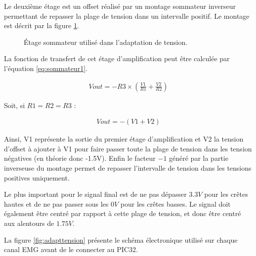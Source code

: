 \documentclass[letterpaper, twoside, 12pt, memoire, creativecommons, hyperref]{thETS}
\begin{document}
Le deuxième étage est un offset réalisé par un montage sommateur inverseur permettant de repasser la plage de tension dans un intervalle positif. Le montage est décrit par la figure \ref{fig:sommateur1}. 

\begin{figure}
	\centering
	\caption{Étage sommateur utilisé dans l'adaptation de tension.}
	\label{fig:sommateur1}
\end{figure}

La fonction de transfert de cet étage d'amplification peut être calculée par l'équation \ref{eq:sommateur1}. 

\begin{align}\label{eq:sommateur1}
   Vout = -R3 \times ( \frac{V1}{R1} + \frac{V2}{R2})
\end{align}

Soit, si $R1 = R2 = R3$ : 

\begin{align}\label{eq:sommateur2}
   Vout = -(V1 + V2)
\end{align}

Ainsi, V1 représente la sortie du premier étage d'amplification et V2 la tension d'offset à ajouter à V1 pour faire passer toute la plage de tension dans les tension négatives (en théorie donc -1.5V). Enfin le facteur $-1$ généré par la partie inverseuse du montage permet de repasser l'intervalle de tension dans les tensions positives uniquement.

Le plus important pour le signal final est de ne pas dépasser $3.3V$ pour les crêtes hautes et de ne pas passer sous les $0V$ pour les crêtes basses. Le signal doit également être centré par rapport à cette plage de tension, et donc être centré aux alentours de $1.75V$.

La figure \ref{fig:adapttension} présente le schéma électronique utilisé sur chaque canal EMG avant de le connecter au PIC32.
\end{document}
